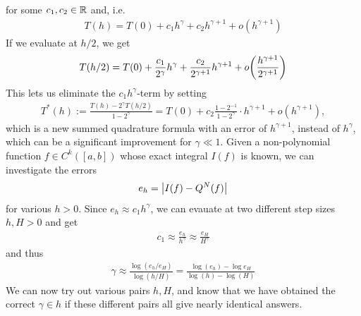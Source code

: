 for some $c_1, c_2 \in \mathbb{R}$ and, i.e.
\begin{align*}
	T(h) = T(0) + c_1 h^\gamma + c_2 h^{\gamma + 1} + o(h^{\gamma + 1})
\end{align*}
If we evaluate at $h/2$, we get
\begin{align*}
	T(h/2) = T(0) + \frac{c_1}{2^\gamma} h^\gamma + \frac{c_2}{2^{\gamma + 1}} h^{\gamma + 1} + o\qty(\frac{h^{\gamma + 1}}{2^{\gamma + 1}})
\end{align*}
This lets us eliminate the $c_1 h^\gamma$-term by setting
\begin{align*}
	T^*(h) := \frac{T(h) - 2^\gamma T(h/2)}{1 - 2^\gamma} = T(0) + c_2 \frac{1 - 2^{-1}}{1 - 2^\gamma} \cdot h^{\gamma + 1} + o(h^{\gamma + 1}),
\end{align*}
which is a new summed quadrature formula with an error of $h^{\gamma + 1}$, instead of $h^\gamma$, which can be a significant improvement for $\gamma \ll 1$.
Given a non-polynomial function $f \in C^k([a,b])$ whose exact integral $I(f)$ is known, we can investigate the errors
\begin{align*}
	e_h = \abs{I(f) - Q^N(f)}
\end{align*}
for various $h > 0$. Since $e_h \approx c_1 h^\gamma$, we can evauate at two different step sizes $h, H > 0$ and get
\begin{align*}
	c_1 \approx \frac{e_h}{h^\gamma} \approx  \frac{e_H}{H^\gamma}
\end{align*}
and thus
\begin{align*}
	\gamma \approx \frac{\log(e_h/e_H)}{\log(h/H)} = \frac{\log(e_h) - \log e_H}{\log(h) - \log(H)}
\end{align*}
We can now try out various pairs $h,H$, and know that we have obtained the correct $\gamma \in h$ if these different pairs all give nearly identical answers.
